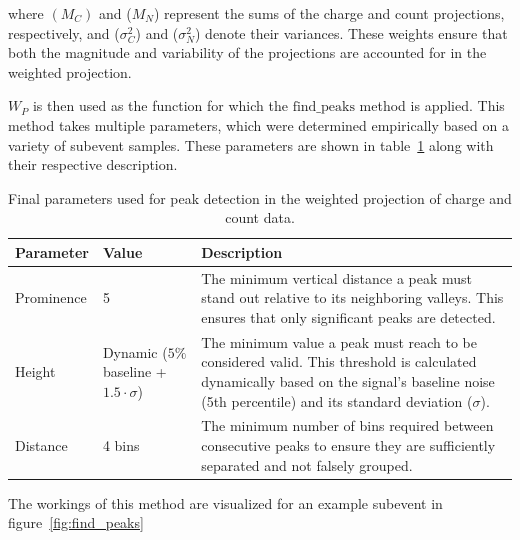 where $(M_C)$ and ($M_N$) represent the sums of the charge and count projections, respectively, and ($\sigma_C^2$) and ($\sigma_N^2$) denote their variances. 
These weights ensure that both the magnitude and variability of the projections are accounted for in the weighted projection. 

$W_P$ is then used as the function for which the $\text{find\_peaks}$ method is applied. This method takes multiple parameters, which were determined empirically 
based on a variety of subevent samples. These parameters are shown in table~\ref{tab:peak_parameters} along with their respective description.


\begin{table}[h!]
    \centering
    \caption{Final parameters used for peak detection in the weighted projection of charge and count data.}
    \begin{tabular}{|l|l|p{7cm}|}
    \hline
    \textbf{Parameter} & \textbf{Value} & \textbf{Description} \\ \hline
    Prominence & 5 & The minimum vertical distance a peak must stand out relative to its neighboring valleys. This ensures that only significant peaks are detected. \\ \hline
    Height & Dynamic (\(5\%\) baseline + \(1.5 \cdot \sigma\)) & The minimum value a peak must reach to be considered valid. This threshold is calculated dynamically based on the signal's baseline noise (5th percentile) and its standard deviation (\(\sigma\)). \\ \hline
    Distance & 4 bins & The minimum number of bins required between consecutive peaks to ensure they are sufficiently separated and not falsely grouped. \\ \hline
    \end{tabular}
    \label{tab:peak_parameters}
\end{table}


The workings of this method are visualized for an example subevent in figure~\ref{fig:find_peaks}

